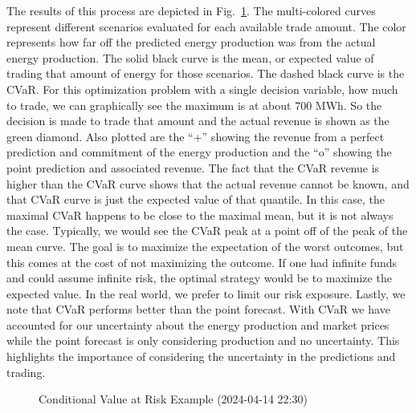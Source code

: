 \documentclass[
  journal,
]{IEEEtran}%
\begin{document}
The results of this process are depicted in Fig.~\ref{fig-cvar-plot}.
The multi-colored curves represent different scenarios evaluated for
each available trade amount. The color represents how far off the
predicted energy production was from the actual energy production. The
solid black curve is the mean, or expected value of trading that amount
of energy for those scenarios. The dashed black curve is the CVaR. For
this optimization problem with a single decision variable, how much to
trade, we can graphically see the maximum is at about 700 MWh. So the
decision is made to trade that amount and the actual revenue is shown as
the green diamond. Also plotted are the ``+'' showing the revenue from a
perfect prediction and commitment of the energy production and the ``o''
showing the point prediction and associated revenue. The fact that the
CVaR revenue is higher than the CVaR curve shows that the actual revenue
cannot be known, and that CVaR curve is just the expected value of that
quantile. In this case, the maximal CVaR happens to be close to the
maximal mean, but it is not always the case. Typically, we would see the
CVaR peak at a point off of the peak of the mean curve. The goal is to
maximize the expectation of the worst outcomes, but this comes at the
cost of not maximizing the outcome. If one had infinite funds and could
assume infinite risk, the optimal strategy would be to maximize the
expected value. In the real world, we prefer to limit our risk exposure.
Lastly, we note that CVaR performs better than the point forecast. With
CVaR we have accounted for our uncertainty about the energy production
and market prices while the point forecast is only considering
production and no uncertainty. This highlights the importance of
considering the uncertainty in the predictions and trading.

\begin{figure}


\caption{\label{fig-cvar-plot}Conditional Value at Risk Example
(2024-04-14 22:30)}

\end{figure}%
\end{document}
